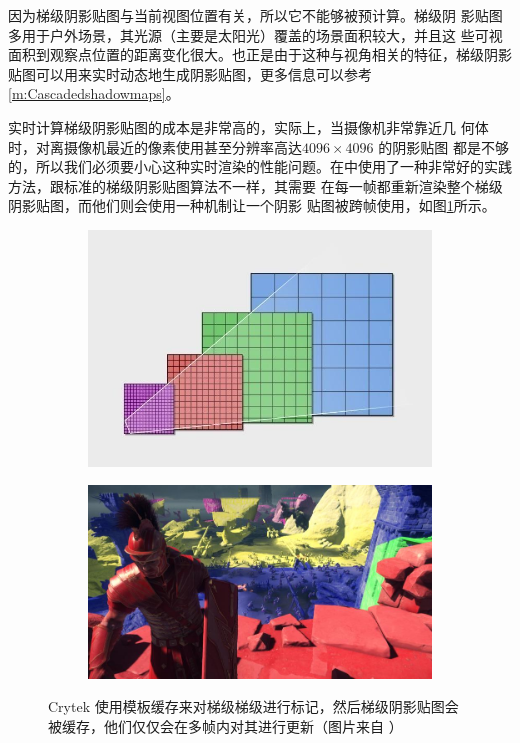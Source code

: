 因为梯级阴影贴图与当前视图位置有关，所以它不能够被预计算。梯级阴 影贴图多用于户外场景，其光源（主要是太阳光）覆盖的场景面积较大，并且这 些可视面积到观察点位置的距离变化很大。也正是由于这种与视角相关的特征，梯级阴影贴图可以用来实时动态地生成阴影贴图，更多信息可以参考\ref{m:Cascadedshadowmaps}。

实时计算梯级阴影贴图的成本是非常高的，实际上，当摄像机非常靠近几 何体时，对离摄像机最近的像素使用甚至分辨率高达$ 4096 \times 4096$ 的阴影贴图 都是不够的，所以我们必须要小心这种实时渲染的性能问题。在\cite{a:PlayingwithReal-TimeShadows}中使用了一种非常好的实践方法，跟标准的梯级阴影贴图算法不一样，其需要 在每一帧都重新渲染整个梯级阴影贴图，而他们则会使用一种机制让一个阴影 贴图被跨帧使用，如图\ref{f:df-crytek-csm}所示。

\begin{figure}
\begin{fullwidth}
	\begin{subfigure}[b]{0.442\thewidth}
		\includegraphics[width=\textwidth]{figures/shadows/crytek-csms-1}	
		\caption{}
	\end{subfigure}
	\begin{subfigure}[b]{0.54\thewidth}
		\includegraphics[width=\textwidth]{figures/shadows/crytek-csms-2}	
		\caption{}
	\end{subfigure}
\caption{Crytek 使用模板缓存来对梯级梯级进行标记，然后梯级阴影贴图会被缓存，他们仅仅会在多帧内对其进行更新（图片来自 \cite{a:PlayingwithReal-TimeShadows}）}
\label{f:df-crytek-csm}
\end{fullwidth}
\end{figure}

